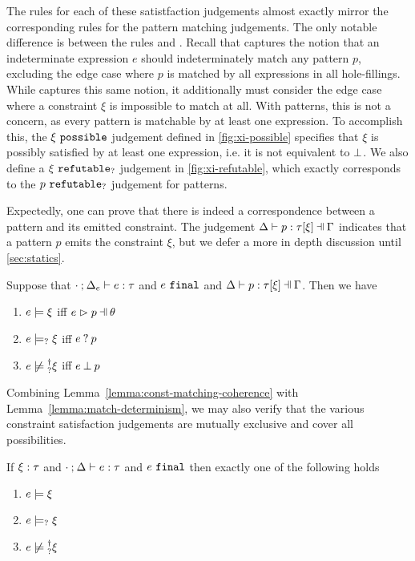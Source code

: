 The rules for each of these satistfaction judgements almost exactly mirror the corresponding rules for the pattern matching judgements. The only notable difference is between the rules \MMNotIntro and \CMSNotIntro. Recall that \MMNotIntro captures the notion that an indeterminate expression $e$ should indeterminately match any pattern $p$, excluding the edge case where $p$ is matched by all expressions in all hole-fillings. While \CMSNotIntro captures this same notion, it additionally must consider the edge case where a constraint $\xi$ is impossible to match at all. With patterns, this is not a concern, as every pattern is matchable by at least one expression. To accomplish this, the $\xi ~\mathtt{possible}$ judgement defined in \autoref{fig:xi-possible} specifies that $\xi$ is possibly satisfied by at least one expression, i.e. it is not equivalent to $\bot$. We also define a $\xi ~\mathtt{refutable}_?$ judgement in \autoref{fig:xi-refutable}, which exactly corresponds to the $p ~\mathtt{refutable}_?$ judgement for patterns. 




Expectedly, one can prove that there is indeed a correspondence between a pattern and its emitted constraint. The judgement $\chpattyp{p}{\tau}{\xi}{\Gamma}{\Delta}$ indicates that a pattern $p$ emits the constraint $\xi$, but we defer a more in depth discussion until \autoref{sec:statics}.

\begin{lemma}
	\label{lemma:const-matching-coherence}
	Suppose that $\cdot \mathbin{;} \Delta_e \vdash e : \tau$ and $e ~\mathtt{final}$ and $\chpattyp{p}{\tau}{\xi}{\Gamma}{\Delta}$. Then we have
	\begin{enumerate}
		\item $e \models \xi$ iff $\hpatmatch{e}{p}{\theta}$
		\item $e \models_{?} \xi$ iff $e \mathbin{?} p$
		\item $\cnotsatisfyormay{e}{\xi}$ iff $e \mathbin{\bot} p$
	\end{enumerate}
\end{lemma}

\pagebreak
 
Combining Lemma~\ref{lemma:const-matching-coherence} with Lemma~\ref{lemma:match-determinism}, we may also verify that the various constraint satisfaction judgements are mutually exclusive and cover all possibilities.

\begin{theorem}
	\label{theorem:exclusive-constraint-satisfaction}
	If $\xi : \tau$ and $\cdot \mathbin{;} \Delta \vdash e : \tau$ and $e ~\mathtt{final}$ then exactly one of the following holds
	\begin{enumerate}
		\item $e \models \xi$
		\item $e \models_{?} \xi$
		\item $\cnotsatisfyormay{e}{\xi}$
	\end{enumerate}
\end{theorem}

